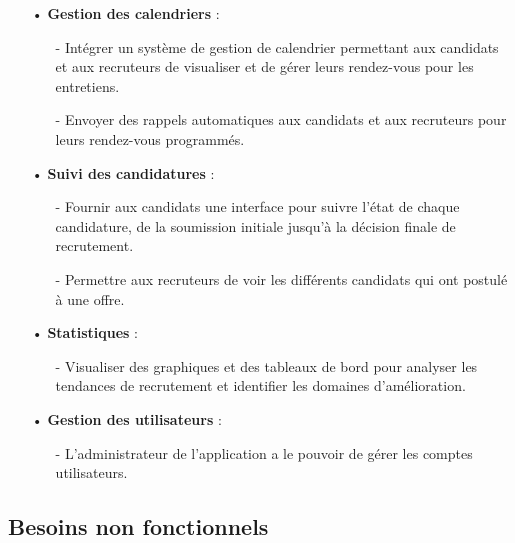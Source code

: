 \begin{itemize}
   \item[•] \textbf{Gestion des calendriers} :
   \begin{itemize}
    \setlength{\itemsep}{0.2cm}
       \item[-] Intégrer un système de gestion de calendrier permettant aux 
       candidats et aux recruteurs de visualiser et de gérer leurs 
       rendez-vous pour les entretiens.
       \item[-] Envoyer des rappels automatiques aux candidats et aux recruteurs pour leurs rendez-vous programmés.
   \end{itemize}
   
   \item[•] \textbf{Suivi des candidatures} :
   \begin{itemize}
    \setlength{\itemsep}{0.2cm}
       \item[-] Fournir aux candidats une interface pour suivre l'état 
       de chaque candidature, de la soumission initiale jusqu'à la 
       décision finale de recrutement.
       \item[-] Permettre aux recruteurs de voir les différents candidats 
       qui ont postulé à une offre.
   \end{itemize}
   
   \item[•] \textbf{Statistiques} :
   \begin{itemize}
    \setlength{\itemsep}{0.2cm}
       \item[-] Visualiser des graphiques et des tableaux de bord pour analyser les tendances de recrutement et identifier les domaines d'amélioration.
   \end{itemize}
   
   \item[•] \textbf{Gestion des utilisateurs} :
   \begin{itemize}
    \setlength{\itemsep}{0.2cm}
       \item[-] L'administrateur de l'application a le pouvoir de gérer les comptes utilisateurs.
       
   \end{itemize}
\end{itemize}



\subsection{Besoins non fonctionnels}

